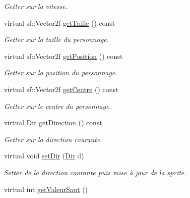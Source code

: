 \begin{DoxyCompactItemize}
\begin{DoxyCompactList}\small\item\em Getter sur la vitesse. \end{DoxyCompactList}\item 
\hypertarget{classDecorateurPersonnage_a5c20877e0481bb134908ce714a520851}{virtual sf\-::\-Vector2f \hyperlink{classDecorateurPersonnage_a5c20877e0481bb134908ce714a520851}{get\-Taille} () const }\label{classDecorateurPersonnage_a5c20877e0481bb134908ce714a520851}

\begin{DoxyCompactList}\small\item\em Getter sur la taille du personnage. \end{DoxyCompactList}\item 
\hypertarget{classDecorateurPersonnage_a53fa1ed5e7c64df20d495c9800bdbffa}{virtual sf\-::\-Vector2f \hyperlink{classDecorateurPersonnage_a53fa1ed5e7c64df20d495c9800bdbffa}{get\-Position} () const }\label{classDecorateurPersonnage_a53fa1ed5e7c64df20d495c9800bdbffa}

\begin{DoxyCompactList}\small\item\em Getter sur la position du personnage. \end{DoxyCompactList}\item 
\hypertarget{classDecorateurPersonnage_a574e80e3d211e749a7b9df95fbd1d525}{virtual sf\-::\-Vector2f \hyperlink{classDecorateurPersonnage_a574e80e3d211e749a7b9df95fbd1d525}{get\-Centre} () const }\label{classDecorateurPersonnage_a574e80e3d211e749a7b9df95fbd1d525}

\begin{DoxyCompactList}\small\item\em Getter sur le centre du personnage. \end{DoxyCompactList}\item 
\hypertarget{classDecorateurPersonnage_a2b6bf162032bc6b8f30c985daf4e0e0c}{virtual \hyperlink{Espace_8h_a7cf6e8c5a5bc5e7b2afef3647870b1c4}{Dir} \hyperlink{classDecorateurPersonnage_a2b6bf162032bc6b8f30c985daf4e0e0c}{get\-Direction} () const }\label{classDecorateurPersonnage_a2b6bf162032bc6b8f30c985daf4e0e0c}

\begin{DoxyCompactList}\small\item\em Getter sur la direction courante. \end{DoxyCompactList}\item 
virtual void \hyperlink{classDecorateurPersonnage_ab1530f6bc3e289018a1bb4594d95e944}{set\-Dir} (\hyperlink{Espace_8h_a7cf6e8c5a5bc5e7b2afef3647870b1c4}{Dir} d)
\begin{DoxyCompactList}\small\item\em Setter de la direction courante puis mise à jour de la sprite. \end{DoxyCompactList}\item 
\hypertarget{classDecorateurPersonnage_a46a71b1fb59b08c50cd3992139dc2906}{virtual int \hyperlink{classDecorateurPersonnage_a46a71b1fb59b08c50cd3992139dc2906}{get\-Valeur\-Saut} ()}\label{classDecorateurPersonnage_a46a71b1fb59b08c50cd3992139dc2906}


\end{DoxyCompactItemize}
